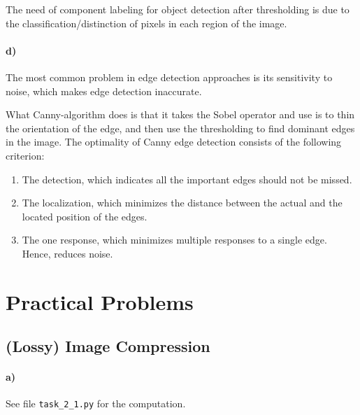 \documentclass[a4paper,twocolumn]{article}
\begin{document}
	The need of component labeling for object detection after thresholding is due to the classification/distinction of pixels in each region of the image.
	
	\paragraph{d)} %

	The most common problem in edge detection approaches is its sensitivity to noise, which makes edge detection inaccurate.
	
	What Canny-algorithm does is that it takes the Sobel operator and use is to thin the orientation of the edge, and then use the thresholding to find dominant edges in the image.
	The optimality of Canny edge detection consists of the following criterion:
	\begin{enumerate}
	\item The detection, which indicates all the important edges should not be missed.
	\item The localization, which minimizes the distance between the actual and the located position of the edges.
	\item The one response, which minimizes multiple responses to a single edge. Hence, reduces noise.
	\end{enumerate}
	
	
	\section{Practical Problems}
	
	\subsection{(Lossy) Image Compression}
	
	\paragraph{a)} See file \texttt{task\_2\_1.py} for the computation.
	
\end{document}
